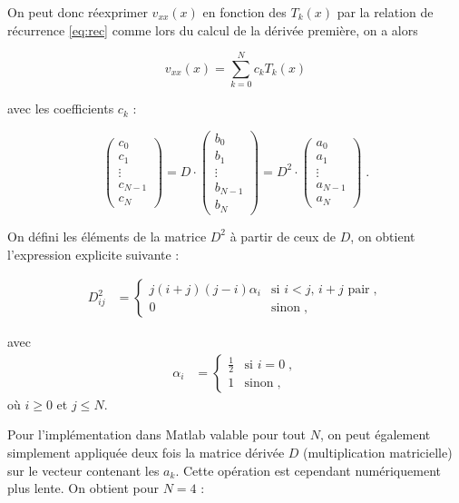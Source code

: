 \documentclass{report}
\begin{document}
On peut donc réexprimer $v_{xx}(x)$ en fonction des $T_{k}(x)$ par la relation de récurrence \eqref{eq:rec} comme lors du calcul de la dérivée première, on a alors 

\begin{equation}
v_{xx}(x) = \sum_{k=0}^N c_k T_k(x) 
\end{equation}

avec les coefficients $c_{k}$ :

\begin{equation}
\begin{pmatrix}
 c_{0}\\ 
 c_{1}\\ 
 \vdots\\ 
 c_{N-1}\\ 
 c_{N}
\end{pmatrix} 
= D \cdot \begin{pmatrix}
 b_0\\ 
 b_1\\ 
 \vdots\\ 
 b_{N-1}\\ 
 b_{N}
\end{pmatrix}
= D^2 \cdot \begin{pmatrix}
 a_0\\ 
 a_1\\ 
 \vdots\\ 
 a_{N-1}\\ 
 a_{N}
\end{pmatrix}\;.
\end{equation}

On défini les éléments de la matrice $D^2$ à partir de ceux de $D$, on obtient l'expression explicite suivante :

\begin{align}
D_{ij}^2 &= 
  \begin{cases}
    j(i+j)(j-i)\alpha_{i} & \text{si $i<j$, $i+j$ pair}\;, \\
0 & \text{sinon}\;,
  \end{cases}
  \end{align}
  
  avec 
  \begin{align}
\alpha_{i} &= 
  \begin{cases}
    \frac{1}{2} & \text{si $i =0$}\;, \\
1 & \text{sinon}\;,
  \end{cases}
  \end{align}
où $i\geq 0$ et $j \leq N$.

Pour l'implémentation dans Matlab valable pour tout $N$, on peut également simplement appliquée deux fois la matrice dérivée $D$ (multiplication matricielle) sur le vecteur contenant les $a_{k}$. Cette opération est cependant numériquement plus lente. On obtient pour $N=4$ :
\end{document}
